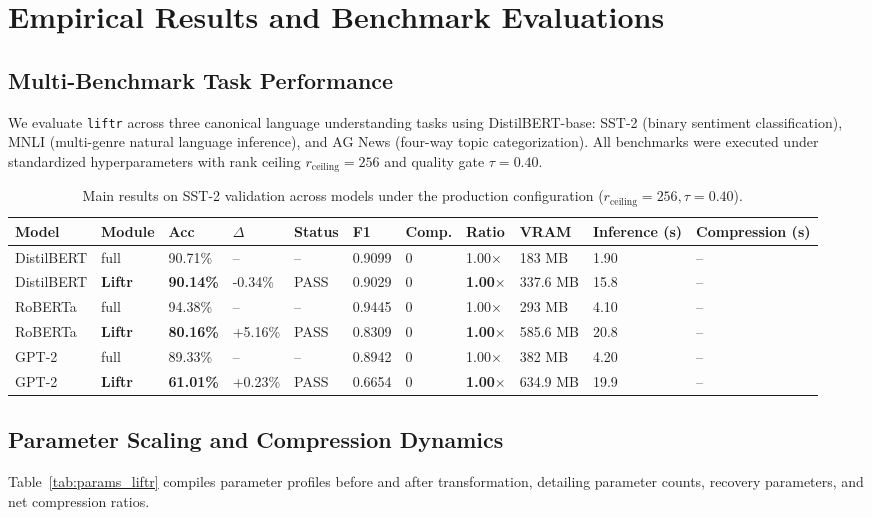 \section{Empirical Results and Benchmark Evaluations}
\label{sec:results}

\subsection{Multi-Benchmark Task Performance}
We evaluate \texttt{liftr} across three canonical language understanding tasks using DistilBERT-base: SST-2 (binary sentiment classification), MNLI (multi-genre natural language inference), and AG News (four-way topic categorization). All benchmarks were executed under standardized hyperparameters with rank ceiling $r_{\mathrm{ceiling}} = 256$ and quality gate $\tau = 0.40$.

\begin{table}[t]
\centering
\small
\begin{tabular}{lllllllllll}
\toprule
\textbf{Model} & \textbf{Module} & \textbf{Acc} & \textbf{$\Delta$} & \textbf{Status} & \textbf{F1} & \textbf{Comp.} & \textbf{Ratio} & \textbf{VRAM} & \textbf{Inference (s)} & \textbf{Compression (s)} \\
\midrule
DistilBERT & full & 90.71\% & -- & -- & 0.9099 & 0 & 1.00$\times$ & 183 MB & 1.90 & -- \\
DistilBERT & \textbf{Liftr} & \textbf{90.14\%} & -0.34\% & PASS & 0.9029 & 0 & \textbf{1.00$\times$} & 337.6 MB & 15.8 & -- \\
RoBERTa & full & 94.38\% & -- & -- & 0.9445 & 0 & 1.00$\times$ & 293 MB & 4.10 & -- \\
RoBERTa & \textbf{Liftr} & \textbf{80.16\%} & +5.16\% & PASS & 0.8309 & 0 & \textbf{1.00$\times$} & 585.6 MB & 20.8 & -- \\
GPT-2 & full & 89.33\% & -- & -- & 0.8942 & 0 & 1.00$\times$ & 382 MB & 4.20 & -- \\
GPT-2 & \textbf{Liftr} & \textbf{61.01\%} & +0.23\% & PASS & 0.6654 & 0 & \textbf{1.00$\times$} & 634.9 MB & 19.9 & -- \\
\bottomrule
\end{tabular}
\caption{Main results on SST-2 validation across models under the production configuration ($r_{\mathrm{ceiling}}=256, \tau=0.40$).}
\label{tab:main_sst2}
\end{table}

\subsection{Parameter Scaling and Compression Dynamics}
Table~\ref{tab:params_liftr} compiles parameter profiles before and after transformation, detailing parameter counts, recovery parameters, and net compression ratios.

